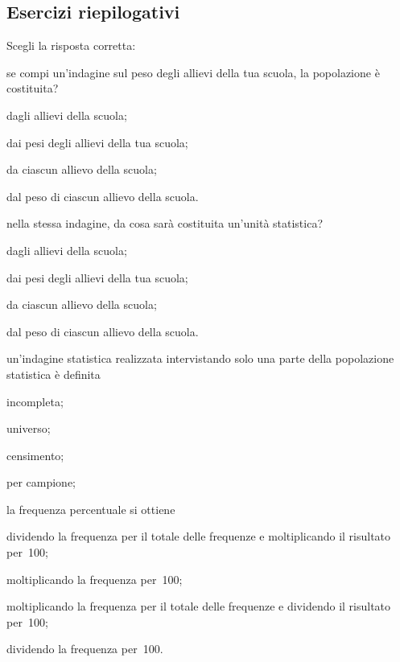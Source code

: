 \subsection{Esercizi riepilogativi}
\begin{esercizio}
\label{ese:A.39}
Scegli la risposta corretta:
\begin{enumerate*}
 \item se compi un'indagine sul peso degli allievi della tua scuola, la 
popolazione è costituita?
 \begin{enumeratea}
 \item dagli allievi della scuola;
\item dai pesi degli allievi della tua scuola;
\item da ciascun allievo della scuola;
\item dal peso di ciascun allievo della scuola.
 \end{enumeratea}
 \item nella stessa indagine, da cosa sarà costituita un'unità statistica?
 \begin{enumeratea}
 \item dagli allievi della scuola;
\item dai pesi degli allievi della tua scuola;
\item da ciascun allievo della scuola;
\item dal peso di ciascun allievo della scuola.
 \end{enumeratea}
\item un'indagine statistica realizzata intervistando solo una parte della 
popolazione statistica è definita
 \begin{enumeratea}
 \item incompleta;
\item universo;
\item censimento;
\item per campione;
 \end{enumeratea}
\item la frequenza percentuale si ottiene
 \begin{enumeratea}
\item dividendo la frequenza per il totale delle frequenze e moltiplicando 
il risultato per~100;
\item moltiplicando la frequenza per~100;
\item moltiplicando la frequenza per il totale delle frequenze e dividendo 
il risultato per~100;
\item dividendo la frequenza per~100.
 \end{enumeratea}

\end{enumerate*}
\end{esercizio}
